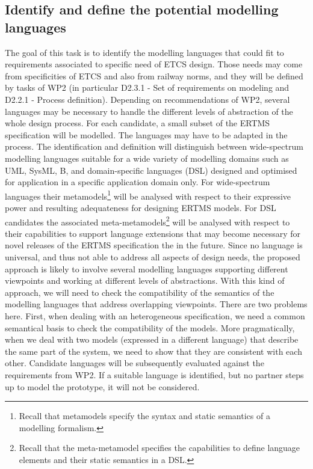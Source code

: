 \documentclass{template/openetcs_article}
\begin{document}
\subsection{Identify and define the potential modelling languages}
\label{sec:language}

The goal of this task is to identify the modelling languages that
could fit to requirements associated to specific need of ETCS
design. Those needs may come from specificities of ETCS and also from
railway norms, and they will be defined by tasks of WP2 
(in particular D2.3.1 - Set of requirements on modeling and D2.2.1 - Process definition). Depending on recommendations of WP2, several languages may
be necessary to handle the different levels of abstraction of the
whole design process.  For each candidate, a small subset of the ERTMS
specification will be modelled. The languages may have to be adapted
in the process. The identification and definition will distinguish
between wide-spectrum modelling languages suitable for a wide variety
of modelling domains such as UML, SysML, B, and domain-specific
languages (DSL) designed and optimised for application in a specific
application domain only.  For wide-spectrum languages their
metamodels\footnote{Recall that metamodels specify the syntax and
  static semantics of a modelling formalism.} will be analysed with
respect to their expressive power and resulting adequateness for
designing ERTMS models.  For DSL candidates the associated
meta-metamodels\footnote{Recall that the meta-metamodel specifies the
  capabilities to define language elements and their static semantics
  in a DSL.}  will be analysed with respect to their capabilities to
support language extensions that may become necessary for novel
releases of the ERTMS specification the in the future.  Since no
language is universal, and thus not able to address all aspects of
design needs, the proposed approach is likely to involve several
modelling languages supporting different viewpoints and working at
different levels of abstractions. With this kind of approach, we will
need to check the compatibility of the semantics of the modelling
languages that address overlapping viewpoints. There are two problems
here. First, when dealing with an heterogeneous specification, we need
a common semantical basis to check the compatibility of the
models. More pragmatically, when we deal with two models (expressed in
a different language) that describe the same part of the system, we
need to show that they are consistent with each other. Candidate
languages will be subsequently evaluated against the requirements from
WP2.  If a suitable language is identified, but no partner steps up to
model the prototype, it will not be considered.
\end{document}

